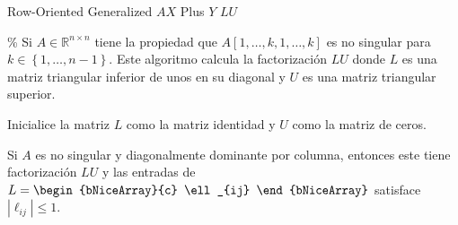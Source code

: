 \begin{algorithm}[H]
    \caption{Row-Oriented Generalized $AX$ Plus $Y$ $LU$}
    \% Si $A\in\mathbb{R}^{n\times n}$ tiene la propiedad que
    $A\left[1,\dotsc,k,1,\dotsc,k\right]$ es no singular para
    $k\in\left\{1,\dotsc,n-1\right\}$.
    Este algoritmo calcula la factorización $LU$ donde $L$ es una
    matriz triangular inferior de unos en su diagonal y $U$ es una
    matriz triangular superior.

    Inicialice la matriz $L$ como la matriz identidad y $U$ como la
    matriz de ceros.

\end{algorithm}

\begin{theorem}
    Si $A$ es no singular y diagonalmente dominante por columna,
    entonces este tiene factorización $LU$ y las entradas de
    \begin{math}
        L=
        \begin{bNiceArray}{c}
            \ell_{ij}
        \end{bNiceArray}
    \end{math}
    satisface
    \begin{math}
        \left|\ell_{ij}\right|\leq 1
    \end{math}.
\end{theorem}

